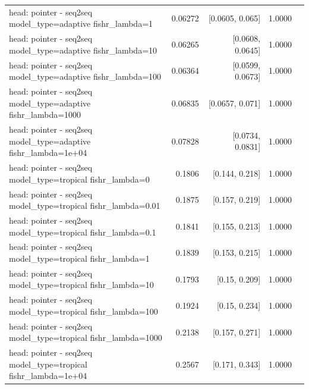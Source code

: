 \documentclass[10pt]{article}
\makeatletter
\newcommand{\stackcell}[1]{\begin{tabular}[t]{@{}l@{}}#1\end{tabular}}
\makeatother
\begin{document}
{\begin{longtable}{lrrrl}
\stackcell{head: pointer - seq2seq\\\footnotesize model\_type=adaptive fishr\_lambda=1 } & 0.06272 & [0.0605, 0.065] & 1.0000 & \\
\stackcell{head: pointer - seq2seq\\\footnotesize model\_type=adaptive fishr\_lambda=10 } & 0.06265 & [0.0608, 0.0645] & 1.0000 & \\
\stackcell{head: pointer - seq2seq\\\footnotesize model\_type=adaptive fishr\_lambda=100 } & 0.06364 & [0.0599, 0.0673] & 1.0000 & \\
\stackcell{head: pointer - seq2seq\\\footnotesize model\_type=adaptive fishr\_lambda=1000 } & 0.06835 & [0.0657, 0.071] & 1.0000 & \\
\stackcell{head: pointer - seq2seq\\\footnotesize model\_type=adaptive fishr\_lambda=1e+04 } & 0.07828 & [0.0734, 0.0831] & 1.0000 & \\
\stackcell{head: pointer - seq2seq\\\footnotesize model\_type=tropical fishr\_lambda=0 } & 0.1806 & [0.144, 0.218] & 1.0000 & \\
\stackcell{head: pointer - seq2seq\\\footnotesize model\_type=tropical fishr\_lambda=0.01 } & 0.1875 & [0.157, 0.219] & 1.0000 & \\
\stackcell{head: pointer - seq2seq\\\footnotesize model\_type=tropical fishr\_lambda=0.1 } & 0.1841 & [0.155, 0.213] & 1.0000 & \\
\stackcell{head: pointer - seq2seq\\\footnotesize model\_type=tropical fishr\_lambda=1 } & 0.1839 & [0.153, 0.215] & 1.0000 & \\
\stackcell{head: pointer - seq2seq\\\footnotesize model\_type=tropical fishr\_lambda=10 } & 0.1793 & [0.15, 0.209] & 1.0000 & \\
\stackcell{head: pointer - seq2seq\\\footnotesize model\_type=tropical fishr\_lambda=100 } & 0.1924 & [0.15, 0.234] & 1.0000 & \\
\stackcell{head: pointer - seq2seq\\\footnotesize model\_type=tropical fishr\_lambda=1000 } & 0.2138 & [0.157, 0.271] & 1.0000 & \\
\stackcell{head: pointer - seq2seq\\\footnotesize model\_type=tropical fishr\_lambda=1e+04 } & 0.2567 & [0.171, 0.343] & 1.0000 & \\

\end{longtable}}
\end{document}
